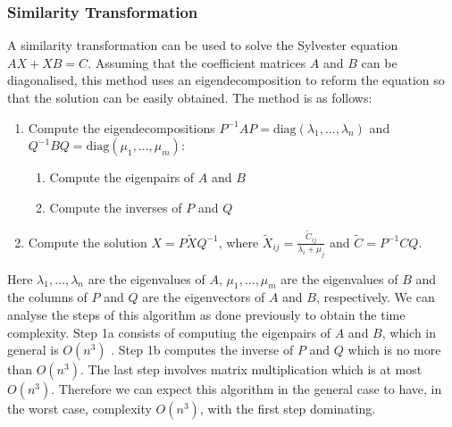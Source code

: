 \documentclass[11pt]{article}
\numberwithin{equation}{section}
\begin{document}
\subsubsection{Similarity Transformation}
A similarity transformation \cite{Simoncini} can be used to solve the Sylvester equation $AX + XB = C$. Assuming that the coefficient matrices $A$ and $B$ can be diagonalised, this method uses an eigendecomposition to reform the equation so that the solution can be easily obtained. The method is as follows:
\begin{enumerate}
\item Compute the eigendecompositions $P^{-1}AP = \text{diag}(\lambda_1, \dots, \lambda_n)$ and $Q^{-1}BQ = \text{diag}(\mu_1, \dots, \mu_m)$:
	\begin{enumerate}
	\item Compute the eigenpairs of $A$ and $B$
	\item Compute the inverses of $P$ and $Q$
	\end{enumerate}
\item Compute the solution $X = P \widetilde{X} Q^{-1}$, where $\widetilde{X}_{ij} = \frac{\widetilde{C}_{ij}}{\lambda_i + \mu_j}$ and $\widetilde{C} = P^{-1}CQ$.
\end{enumerate}
Here $\lambda_1, \dots, \lambda_n$ are the eigenvalues of $A$, $\mu_1, \dots, \mu_m$ are the eigenvalues of $B$ and the columns of $P$ and $Q$ are the eigenvectors of $A$ and $B$, respectively. We can analyse the steps of this algorithm as done previously to obtain the time complexity. Step 1a consists of computing the eigenpairs of $A$ and $B$, which in general is $O(n^3)$ \cite{Pan}. Step 1b computes the inverse of $P$ and $Q$ which is no more than $O(n^3)$. The last step involves matrix multiplication which is at most $O(n^3)$. Therefore we can expect this algorithm in the general case to have, in the worst case, complexity $O(n^3)$, with the first step dominating.
\end{document}
